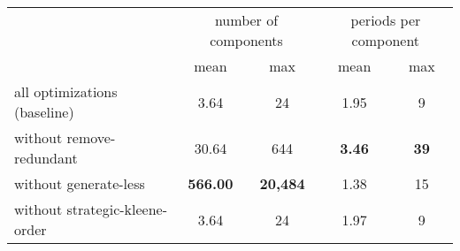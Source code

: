 \begin{table}[H]
	\centering
	\begin{tabular}{l c c c c}
		\toprule
		& \multicolumn{2}{c}{number of components} & \multicolumn{2}{c}{periods per component} \\
		\cmidrule(lr){2-3} \cmidrule(lr){4-5}
		& mean & max & mean & max \\
		\midrule
	all optimizations (baseline) & 3.64 & 24 & 1.95 & 9 \\
	without remove-redundant & 30.64 & 644 & \textbf{3.46} & \textbf{39} \\
	without generate-less & \textbf{566.00} & \textbf{20{,}484} & 1.38 & 15 \\
	without strategic-kleene-order & 3.64 & 24 & 1.97 & 9 \\
  \bottomrule
	\end{tabular}
\end{table}
